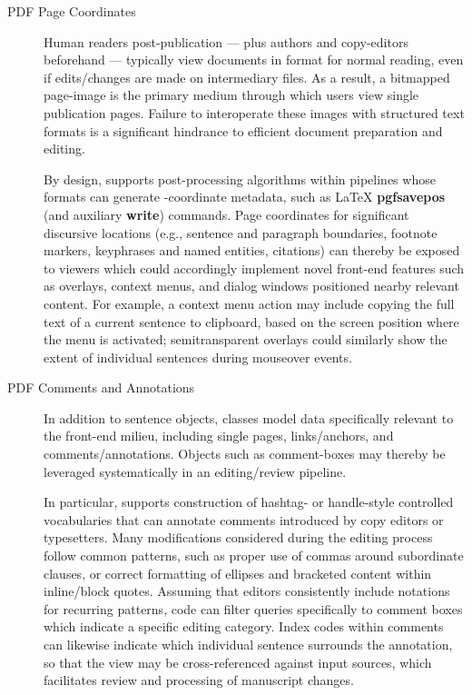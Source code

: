 \documentclass[11pt]{article}
\begin{document}
{{\begin{description}
\item[PDF Page Coordinates]  Human readers post-publication 
--- plus authors and copy-editors beforehand --- typically 
view documents in \PDF{} format for normal reading, even if 
edits/changes are made on intermediary files.  As a result, 
a bitmapped page-image is the primary medium through 
which users view single publication pages.  Failure to 
interoperate these images with structured text formats 
is a significant hindrance to efficient document 
preparation and editing.

\pseudoIndent{} By design, \PacTk{} supports post-processing 
algorithms within pipelines whose formats can generate 
\PDF{}-coordinate metadata, such as \LaTeX{} 
\textbf{pgfsavepos} (and auxiliary \textbf{write}) commands.  
Page coordinates for significant discursive locations 
(e.g., sentence and paragraph boundaries, footnote markers, 
keyphrases and named entities, citations) can thereby be 
exposed to \PDF{} viewers which could accordingly implement 
novel front-end features such as overlays, context menus, 
and dialog windows positioned nearby relevant content.  
For example, a context menu action may include copying the 
full text of a current sentence to clipboard, based on the 
screen position where the menu is activated; semitransparent 
overlays could similarly show the extent of individual 
sentences during mouseover events.
  
\item[PDF Comments and Annotations]  In addition to sentence 
objects, \PacTk{} classes model data specifically relevant to 
the \PDF{} front-end milieu, including single pages, links/anchors, and 
comments/annotations.  Objects such as comment-boxes 
may thereby be leveraged systematically in an editing/review pipeline.

\pseudoIndent{} In particular, \PacTk{} supports construction of hashtag- or handle-style 
controlled vocabularies that can annotate \PDF{} comments 
introduced by copy editors or typesetters.  Many modifications considered 
during the editing process follow common patterns, such as 
proper use of commas around subordinate clauses, or correct formatting 
of ellipses and bracketed content within inline/block quotes.  Assuming 
that editors consistently include notations for recurring patterns, 
\PacTk{} code can filter queries specifically to \PDF{} comment 
boxes which indicate a specific editing category.  Index codes within 
\PDF{} comments can likewise indicate which individual sentence 
surrounds the annotation, so that the \PDF{} view may be cross-referenced 
against input sources, which facilitates review and processing 
of manuscript changes.


\end{description}}}
\end{document}
